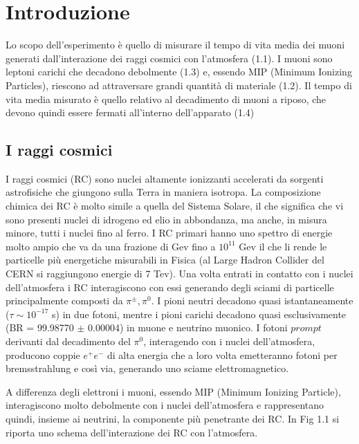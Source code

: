 \documentclass{standalone}
\begin{document}
	\pagestyle{fancy}
	\lhead{\rightmark}
	\rhead{\thepage}

\chapter{Introduzione}
Lo scopo dell'esperimento è quello di misurare il tempo di vita media dei muoni generati dall'interazione dei raggi cosmici con l'atmosfera (1.1). I muoni sono leptoni carichi che decadono debolmente (1.3) e, essendo MIP (Minimum Ionizing Particles), riescono ad attraversare grandi quantità di materiale (1.2). Il tempo di vita media misurato è quello relativo al decadimento di muoni a riposo, che devono quindi essere fermati all'interno dell'apparato (1.4)

\section{I raggi cosmici}
I raggi cosmici (RC) sono nuclei altamente ionizzanti accelerati da sorgenti astrofisiche che giungono sulla Terra in maniera isotropa. La composizione chimica dei RC è molto simile a quella del Sistema Solare, il che significa che vi sono presenti nuclei di idrogeno ed elio in abbondanza, ma anche, in misura minore,  tutti i nuclei fino al ferro.
I RC primari hanno uno spettro di energie molto ampio che va da una frazione di Gev fino a $10^{11}$ Gev il che li rende le particelle più energetiche misurabili in Fisica (al Large Hadron Collider del CERN si raggiungono energie di 7 Tev).
Una volta entrati in contatto con i nuclei dell'atmosfera i RC interagiscono con essi generando degli sciami di particelle principalmente composti da $\pi^\pm, \pi^0$.
I pioni neutri decadono quasi istantaneamente ($\tau \sim 10^{-17}$ s) in due fotoni, mentre i pioni carichi decadono quasi esclusivamente (BR = 99.98770 $\pm$ 0.00004) in muone e neutrino muonico.
I fotoni $prompt$ derivanti dal decadimento del $\pi^0$, interagendo con i nuclei dell'atmosfera, producono coppie $e^+e^-$ di alta energia che a loro volta emetteranno fotoni per bremsstrahlung e così via, generando uno sciame elettromagnetico.

A differenza degli elettroni i muoni, essendo MIP (Minimum Ionizing Particle), interagiscono molto debolmente con i nuclei dell'atmosfera e rappresentano quindi, insieme ai neutrini, la componente più penetrante dei RC. In Fig 1.1 si riporta uno schema dell'interazione dei RC con l'atmosfera.
\end{document}
